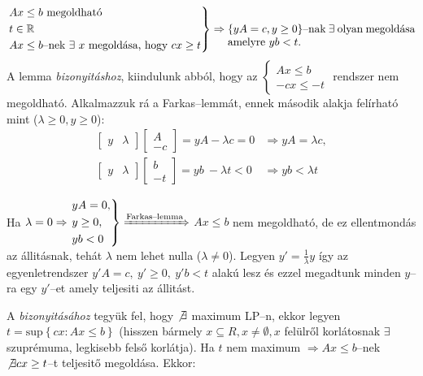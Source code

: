 \[
\begin{rcases}
Ax \leq b \mbox{ megoldható} \\
t \in \mathbb{R} \\
Ax \leq b \mbox{--nek } \exists~x \mbox{ megoldása, hogy } cx \geq t
\end{rcases} \Rightarrow
\parbox[t]{6cm}{
$\{yA=c, y \geq 0\}$--nak $\exists$ olyan megoldása amelyre  $yb < t$.}
\]
A lemma \emph{bizonyitáshoz}, kiindulunk abból, hogy az $\begin{cases}
Ax \leq b \\
-cx \leq -t
\end{cases}$ rendszer nem megoldható. Alkalmazzuk rá a Farkas--lemmát, ennek második
alakja felírható mint ($\lambda \geq 0, y \geq 0$):
\begin{align*}
\begin{bmatrix} y & \lambda\end{bmatrix}
\begin{bmatrix} A \\ -c \end{bmatrix} = yA - \lambda c = 0 &\Rightarrow 
yA = \lambda c, \\
\begin{bmatrix} y & \lambda\end{bmatrix}
\begin{bmatrix} b \\ -t \end{bmatrix} =yb~ - \lambda t < 0 &\Rightarrow 
yb < \lambda t
\end{align*}

Ha $\lambda=0 \Rightarrow \begin{rcases}
yA = 0, \\
y \geq 0, \\
yb <  0 \end{rcases} \xRightarrow{\text{Farkas--lemma}}$ $Ax \leq b$ nem
megoldható, de ez ellentmondás az állitásnak, tehát $\lambda$ nem lehet nulla
($\lambda \neq 0$). Legyen $y'=\frac{1}{\lambda}y$ így az egyenletrendszer
$y'A=c,~y'\geq0,~y'b<t$ alakú lesz és ezzel megadtunk minden $y$--ra egy
$y'$--et amely teljesiti az állitást.

A  \emph{bizonyitásához} tegyük fel, hogy $\not \exists$ maximum
LP--n, ekkor legyen $t=\mbox{sup}\left\{cx:Ax \leq b \right\}$ (hisszen bármely
$x \subseteq R, x \neq \emptyset, x$ felülről korlátosnak $\exists$ szuprémuma,
legkisebb felső korlátja). Ha $t$ nem maximum $\Rightarrow Ax \leq b$--nek $\not
\exists cx \geq t$--t teljesitő megoldása. Ekkor:

